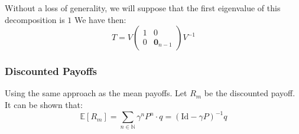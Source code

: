 Without a loss of generality, we will suppose that the first eigenvalue of this decomposition is $1$
We have then:
$$
T=V\begin{pmatrix}1 & 0\\
	0&\boldsymbol{0}_{n-1}\end{pmatrix}V^{-1}
$$


\subsubsection{Discounted Payoffs}
Using the same approach as the mean payoffs. Let $R_m$ be the discounted payoff.
It can be shown that:
$$
\mathbb{E}[R_m]=\sum_{n\in\mathbb{N}} \gamma^nP^n \cdot q=(\text{Id}-\gamma P)^{-1}q
$$
